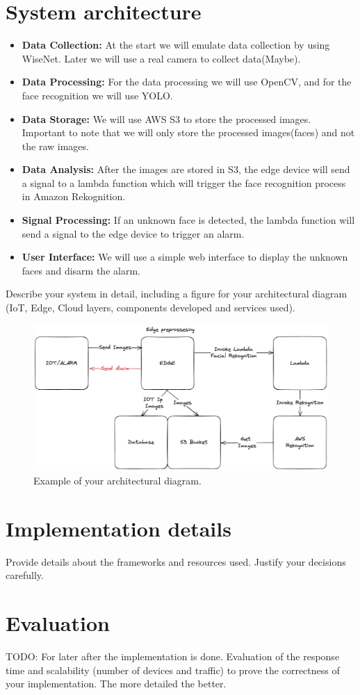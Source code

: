 \documentclass[conference]{IEEEtran}
\begin{document}
\section{System architecture}
\begin{itemize}
    \item \textbf{Data Collection:} At the start we will emulate data collection by using WiseNet. Later we will use a real camera to collect data(Maybe).
    \item \textbf{Data Processing:} For the data processing we will use OpenCV, and for the face recognition we will use YOLO.
    \item \textbf{Data Storage:} We will use AWS S3 to store the processed images. Important to note that we will only store the processed images(faces) and not the raw images.
    \item \textbf{Data Analysis:} After the images are stored in S3, the edge device will send a signal to a lambda function which will trigger the face recognition process in Amazon Rekognition.
    \item \textbf{Signal Processing:} If an unknown face is detected, the lambda function will send a signal to the edge device to trigger an alarm.  
    \item \textbf{User Interface:} We will use a simple web interface to display the unknown faces and disarm the alarm.
\end{itemize}
Describe your system in detail, including a figure for your architectural diagram (IoT, Edge, Cloud layers, components developed and services used).

\begin{figure}[h!]
    \centering
    \includegraphics[width=1\linewidth]{images/architecture.excalidraw.png}
    \caption{Example of your architectural diagram.}
    \label{fig:enter-label}
\end{figure}

\section{Implementation details}
Provide details about the frameworks and resources used. Justify your decisions carefully.

\section{Evaluation}
TODO: For later after the implementation is done.
Evaluation of the response time and scalability (number of devices and traffic) to prove the correctness of your implementation. The more detailed the better. 
\end{document}
